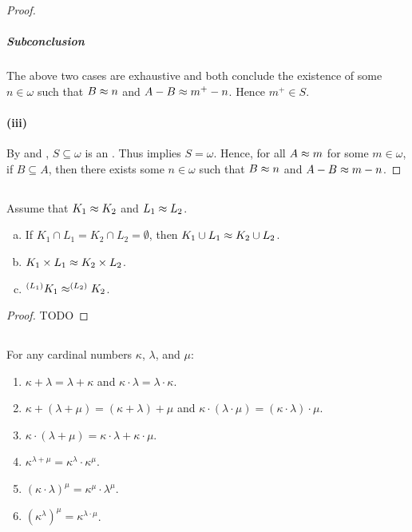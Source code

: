 \documentclass{report}
\begin{document}
\begin{proof}
      \subparagraph{Subconclusion}%

        The above two cases are exhaustive and both conclude the existence of
          some $n \in \omega$ such that $B \approx n$ and $A - B \approx m^+ - n$.
        Hence $m^+ \in S$.

    \paragraph{(iii)}%

      By  and
        , $S \subseteq \omega$ is an
        .
      Thus  implies $S = \omega$.
      Hence, for all $A \approx m$ for some $m \in \omega$, if $B \subseteq A$,
        then there exists some $n \in \omega$ such that $B \approx n$ and
        $A - B \approx m - n$.

  \end{proof}

\subsection{}%

  Assume that $K_1 \approx K_2$ and $L_1 \approx L_2$.
    \begin{enumerate}[(a)]
      \item If $K_1 \cap L_1 = K_2 \cap L_2 = \emptyset$, then
        $K_1 \cup L_1 \approx K_2 \cup L_2$.
      \item $K_1 \times L_1 \approx K_2 \times L_2$.
      \item $^{(L_1)}{K_1} \approx ^{(L_2)}{K_2}$.
    \end{enumerate}

  \begin{proof}
    TODO
  \end{proof}

\subsection{}%

  For any cardinal numbers $\kappa$, $\lambda$, and $\mu$:
    \begin{enumerate}
      \item $\kappa + \lambda = \lambda + \kappa$ and
        $\kappa \cdot \lambda = \lambda \cdot \kappa$.
      \item $\kappa + (\lambda + \mu) = (\kappa + \lambda) + \mu$ and
        $\kappa \cdot (\lambda \cdot \mu) = (\kappa \cdot \lambda) \cdot \mu$.
      \item $\kappa \cdot (\lambda + \mu) =
        \kappa \cdot \lambda + \kappa \cdot \mu$.
      \item $\kappa^{\lambda + \mu} = \kappa^\lambda \cdot \kappa^\mu$.
      \item $(\kappa \cdot \lambda)^\mu = \kappa^\mu \cdot \lambda^\mu$.
      \item $(\kappa^\lambda)^\mu = \kappa^{\lambda \cdot \mu}$.
    \end{enumerate}
\end{document}
